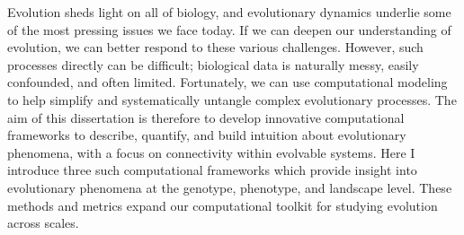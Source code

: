 Evolution sheds light on all of biology, and evolutionary dynamics underlie some of the most pressing issues we face today.  
If we can deepen our understanding of evolution, we can better respond to these various challenges.
However, such processes directly can be difficult; biological data is naturally messy, easily confounded, and often limited. 
Fortunately, we can use computational modeling to help simplify and systematically untangle complex evolutionary processes.
The aim of this dissertation is therefore to develop innovative computational frameworks to describe, quantify, and build intuition about evolutionary phenomena, with a focus on connectivity within evolvable systems. 
Here I introduce three such computational frameworks which provide insight into evolutionary phenomena at the genotype, phenotype, and landscape level.
These methods and metrics expand our computational toolkit for studying evolution across scales.